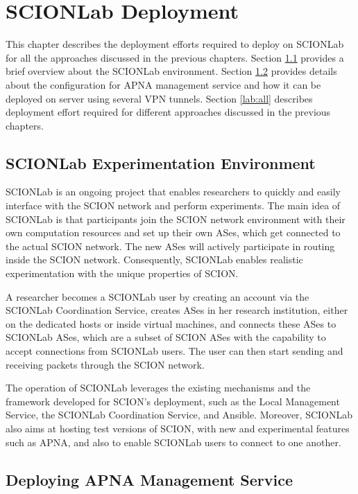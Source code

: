 
\chapter{SCIONLab Deployment} %
\label{scionlab} %

This chapter describes the deployment efforts required to deploy on SCIONLab for all the approaches discussed in the previous chapters. Section \ref{lab:intro} provides a brief overview about the SCIONLab environment. Section \ref{lab:apna_srv} provides details about the configuration for APNA management service and how it can be deployed on server using several VPN tunnels. Section \ref{lab:all} describes deployment effort required for different approaches discussed in the previous chapters.

\section{SCIONLab Experimentation Environment} \label{lab:intro}
SCIONLab  is an ongoing project that enables researchers to quickly and easily interface with the SCION network and perform experiments. The main idea of SCIONLab is that participants join the SCION network environment with their own computation resources and set up their own ASes, which get connected to the actual SCION network. The new ASes will actively participate in routing inside the SCION network. Consequently, SCIONLab enables realistic experimentation with the unique properties of SCION.

A researcher becomes a SCIONLab user by creating an account via the SCIONLab Coordination Service, creates ASes in her research institution, either on the dedicated hosts or inside virtual machines, and connects these ASes to SCIONLab ASes, which are a subset of SCION ASes with the capability to accept connections from SCIONLab users. The user can then start sending and receiving packets through the SCION network.

The operation of SCIONLab leverages the existing mechanisms and the framework developed for SCION's deployment, such as the Local Management Service, the SCIONLab Coordination Service, and Ansible. Moreover, SCIONLab also aims at hosting test versions of SCION, with new and experimental features such as APNA, and also to enable SCIONLab users to connect to one another.

\section{Deploying APNA Management Service} \label{lab:apna_srv}
